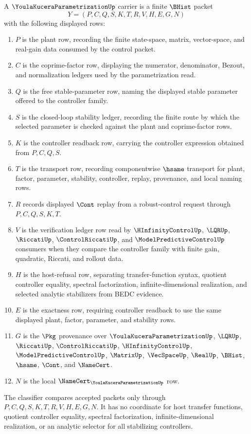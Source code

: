 \begin{definition}
\label{def:youla-kucera-parametrization-carrier}
A $\YoulaKuceraParametrizationUp$ carrier is a finite $\BHist$ packet
$$
Y=(P,C,Q,S,K,T,R,V,H,E,G,N)
$$
with the following displayed rows:
\begin{enumerate}
\item $P$ is the plant row, recording the finite state-space, matrix, vector-space, and real-gain data consumed by the control packet.
\item $C$ is the coprime-factor row, displaying the numerator, denominator, Bezout, and normalization ledgers used by the parametrization read.
\item $Q$ is the free stable-parameter row, naming the displayed stable parameter offered to the controller family.
\item $S$ is the closed-loop stability ledger, recording the finite route by which the selected parameter is checked against the plant and coprime-factor rows.
\item $K$ is the controller readback row, carrying the controller expression obtained from $P,C,Q,S$.
\item $T$ is the transport row, recording componentwise $\hsame$ transport for plant, factor, parameter, stability, controller, replay, provenance, and local naming rows.
\item $R$ records displayed $\Cont$ replay from a robust-control request through $P,C,Q,S,K,T$.
\item $V$ is the verification ledger row read by $\HInfinityControlUp$, $\LQRUp$, $\RiccatiUp$, $\ControlRiccatiUp$, and $\ModelPredictiveControlUp$ consumers when they compare the controller family with finite gain, quadratic, Riccati, and rollout data.
\item $H$ is the host-refusal row, separating transfer-function syntax, quotient controller equality, spectral factorization, infinite-dimensional realization, and selected analytic stabilizers from BEDC evidence.
\item $E$ is the exactness row, requiring controller readback to use the same displayed plant, factor, parameter, and stability rows.
\item $G$ is the $\Pkg$ provenance over $\YoulaKuceraParametrizationUp$, $\LQRUp$, $\RiccatiUp$, $\ControlRiccatiUp$, $\HInfinityControlUp$, $\ModelPredictiveControlUp$, $\MatrixUp$, $\VecSpaceUp$, $\RealUp$, $\BHist$, $\hsame$, $\Cont$, and $\NameCert$.
\item $N$ is the local $\NameCert_{\YoulaKuceraParametrizationUp}$ row.
\end{enumerate}
The classifier compares accepted packets only through $P,C,Q,S,K,T,R,V,H,E,G,N$. It has no coordinate for host transfer functions, quotient controller equality, spectral factorization, infinite-dimensional realization, or an analytic selector for all stabilizing controllers.
\end{definition}

